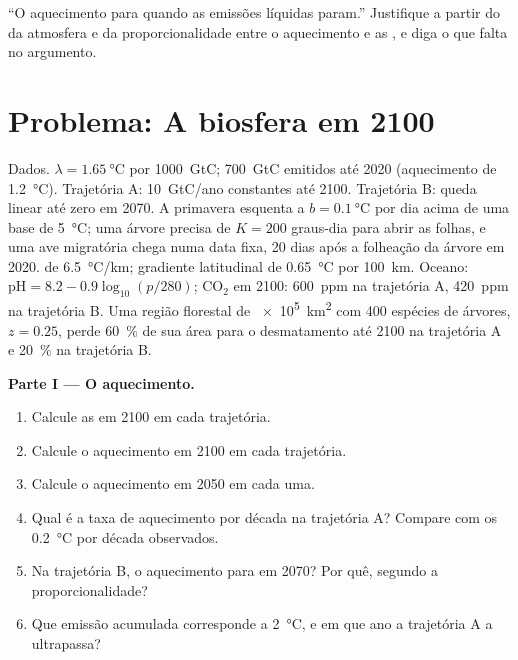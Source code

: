 \begin{exercise}[$\star\star\star$]\label{exo:b2:global-change:12}
``O aquecimento para quando as emissões líquidas param.'' Justifique a
partir do  da atmosfera e da proporcionalidade entre o
aquecimento e as , e diga o que falta no argumento.
\end{exercise}

\section{Problema: A biosfera em 2100}

\begin{problem}
\label{pb:b2:global-change:1}
Dados. $\lambda = \qty{1.65}{\celsius}$ por \qty{1000}{GtC};
\qty{700}{GtC} emitidos até 2020 (aquecimento de \qty{1.2}{\celsius}).
Trajetória A: \qty{10}{GtC/ano} constantes até 2100. Trajetória B: queda
linear até zero em 2070. A primavera esquenta a $b = \qty{0.1}{\celsius}$
por dia acima de uma base de \qty{5}{\celsius}; uma árvore precisa de
$K = 200$ graus-dia para abrir as folhas, e uma ave migratória chega numa
data fixa, 20 dias após a folheação da árvore em 2020.  de \qty{6.5}{\celsius/km}; gradiente latitudinal de
\qty{0.65}{\celsius} por \qty{100}{km}. Oceano: $\mathrm{pH} = 8.2 - 0.9\log_{10}(p/280)$;
\ensuremath{\mathrm{CO_2}} em 2100: \qty{600}{ppm} na trajetória A,
\qty{420}{ppm} na trajetória B. Uma região florestal de \qty{e5}{km^2}
com 400 espécies de árvores, $z = 0.25$, perde \qty{60}{\%} de sua área
para o desmatamento até 2100 na trajetória A e \qty{20}{\%} na
trajetória B.

\medskip
\noindent\textbf{Parte I --- O aquecimento.}
\begin{enumerate}
  \item Calcule as  em 2100 em cada trajetória.
  \item Calcule o aquecimento em 2100 em cada trajetória.
  \item Calcule o aquecimento em 2050 em cada uma.
  \item Qual é a taxa de aquecimento por década na trajetória A? Compare
        com os \qty{0.2}{\celsius} por década observados.
  \item Na trajetória B, o aquecimento para em 2070? Por quê, segundo
        a proporcionalidade?
  \item Que emissão acumulada corresponde a \qty{2}{\celsius},
        e em que ano a trajetória A a ultrapassa?
\end{enumerate}


\end{problem}
